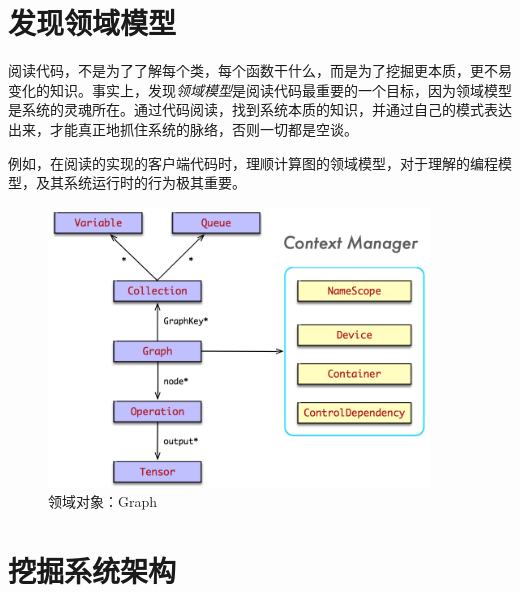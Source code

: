 \section{发现领域模型}

\begin{content}

阅读代码，不是为了了解每个类，每个函数干什么，而是为了挖掘更本质，更不易变化的知识。事实上，发现\emph{领域模型}是阅读代码最重要的一个目标，因为领域模型是系统的灵魂所在。通过代码阅读，找到系统本质的知识，并通过自己的模式表达出来，才能真正地抓住系统的脉络，否则一切都是空谈。

例如，在阅读\tf{}的实现的客户端代码时，理顺计算图的领域模型，对于理解的编程模型，及其系统运行时的行为极其重要。

\begin{figure}[!htbp]
\centering
\includegraphics[width=0.9\textwidth]{figures/py-graph.png}
\caption{领域对象：Graph}
 \label{fig:py-graph}
\end{figure}

\end{content}

\section{挖掘系统架构}

